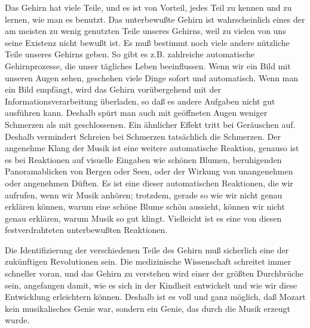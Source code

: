 Das Gehirn hat viele Teile, und es ist von Vorteil, jedes Teil zu kennen und zu lernen, wie man es benutzt.
 Das unterbewußte Gehirn ist wahrscheinlich eines der am meisten zu wenig genutzten Teile unseres Gehirns, weil zu vielen von uns seine Existenz nicht bewußt ist.
 Es muß bestimmt noch viele andere nützliche Teile unseres Gehirns geben.
 So gibt es z.B. zahlreiche automatische Gehirnprozesse, die unser tägliches Leben beeinflussen.
 Wenn wir ein Bild mit unseren Augen sehen, geschehen viele Dinge sofort und automatisch.
 Wenn man ein Bild empfängt, wird das Gehirn vorübergehend mit der Informationsverarbeitung überladen, so daß es andere Aufgaben nicht gut ausführen kann.
 Deshalb spürt man auch mit geöffneten Augen weniger Schmerzen als mit geschlossenen.
 Ein ähnlicher Effekt tritt bei Geräuschen auf.
 Deshalb vermindert Schreien bei Schmerzen tatsächlich die Schmerzen.
 Der angenehme Klang der Musik ist eine weitere automatische Reaktion, genauso ist es bei Reaktionen auf visuelle Eingaben wie schönen Blumen, beruhigenden Panoramablicken von Bergen oder Seen, oder der Wirkung von unangenehmen oder angenehmen Düften.
 Es ist eine dieser automatischen Reaktionen, die wir aufrufen, wenn wir Musik anhören;  trotzdem, gerade so wie wir nicht genau erklären können, warum eine schöne Blume schön aussieht, können wir nicht genau erklären, warum Musik so gut klingt.
 Vielleicht ist es eine von diesen festverdrahteten unterbewußten Reaktionen.
 

Die Identifizierung der verschiedenen Teile des Gehirn muß sicherlich eine der zukünftigen Revolutionen sein.
 Die medizinische Wissenschaft schreitet immer schneller voran, und das Gehirn zu verstehen wird einer der größten Durchbrüche sein, angefangen damit, wie es sich in der Kindheit entwickelt und wie wir diese Entwicklung erleichtern können.
 Deshalb ist es voll und ganz möglich, daß Mozart kein musikalisches Genie war, sondern ein Genie, das durch die Musik erzeugt wurde.


